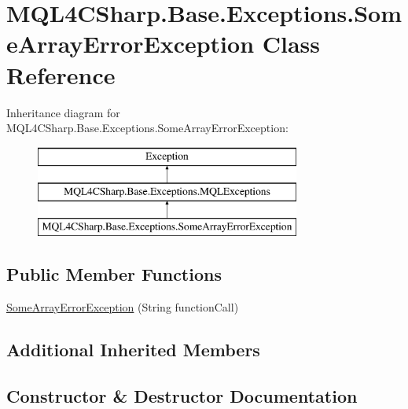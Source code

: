 \hypertarget{class_m_q_l4_c_sharp_1_1_base_1_1_exceptions_1_1_some_array_error_exception}{}\section{M\+Q\+L4\+C\+Sharp.\+Base.\+Exceptions.\+Some\+Array\+Error\+Exception Class Reference}
\label{class_m_q_l4_c_sharp_1_1_base_1_1_exceptions_1_1_some_array_error_exception}
Inheritance diagram for M\+Q\+L4\+C\+Sharp.\+Base.\+Exceptions.\+Some\+Array\+Error\+Exception\+:\begin{figure}[H]
\begin{center}
\leavevmode
\includegraphics[height=3.000000cm]{class_m_q_l4_c_sharp_1_1_base_1_1_exceptions_1_1_some_array_error_exception}
\end{center}
\end{figure}
\subsection*{Public Member Functions}
\begin{DoxyCompactItemize}
\item 
\hyperlink{class_m_q_l4_c_sharp_1_1_base_1_1_exceptions_1_1_some_array_error_exception_a9fe3f753592e1de6607eded388c8d6e1}{Some\+Array\+Error\+Exception} (String function\+Call)
\end{DoxyCompactItemize}
\subsection*{Additional Inherited Members}


\subsection{Constructor \& Destructor Documentation}
